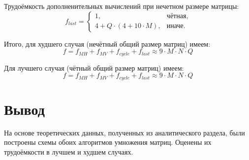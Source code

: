 Трудоёмкость дополненительных вычислений при нечетном размере матрицы:
\begin{equation}
	\label{for:impr_last}
	f_{last} = 
	\begin{cases}
		1, & \text{чётная,}\\
		4 + Q \cdot (4 + 10\cdot M), & \text{иначе.}
	\end{cases}
\end{equation}

Итого, для худшего случая (нечётный общий размер матриц) имеем:
\begin{equation}
	\label{for:bad_impr}
	f = f_{MH} + f_{MV} + f_{cycle} + f_{last} \approx 9\cdot M\cdot N\cdot Q
\end{equation}

Для лучшего случая (чётный общий размер матриц) имеем:
\begin{equation}
	\label{for:good_impr}
	f = f_{MH} + f_{MV} + f_{cycle} + f_{last} \approx 9\cdot M\cdot N\cdot Q
\end{equation}


\section*{Вывод}

На основе теоретических данных, полученных из аналитического раздела, были построены схемы обоих алгоритмов умножения матриц.  Оценены их трудоёмкости в лучшем и худшем случаях.
